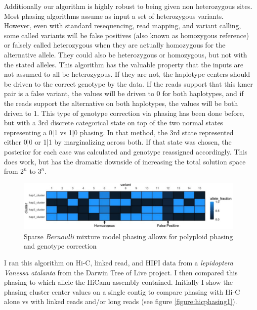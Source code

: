 \par{
Additionally our algorithm is highly robust to being given non heterozygous sites. Most phasing algorithms assume as input a set of heterozygous variants. However, even with standard resequencing, read mapping, and variant calling, some called variants will be false positives (also known as homozygous reference) or falsely called heterozygous when they are actually homozygous for the alternative allele. They could also be heterozygous or homozygous, but not with the stated alleles. This algorithm has the valuable property that the inputs are not assumed to all be heterozygous. If they are not, the haplotype centers should be driven to the correct genotype by the data. If the reads support that this kmer pair is a false variant, the values will be driven to 0 for both haplotypes, and if the reads support the alternative on both haplotypes, the values will be both driven to 1. This type of genotype correction via phasing has been done before, but with a 3rd discrete categorical state on top of the two normal states representing a 0|1 vs 1|0 phasing\cite{mypatent}. In that method, the 3rd state represented either 0|0 or 1|1 by marginalizing across both. If that state was chosen, the posterior for each case was calculated and genotype reassigned accordingly. This does work, but has the dramatic downside of increasing the total solution space from $2^n$ to $3^n$.
} 


\begin{figure}[htbp!]
\caption{Sparse \textit{Bernoulli} mixture model phasing allows for polyploid phasing and genotype correction}
\label{figure:bernoulli}
\begin{centering}
\includegraphics[width=\textwidth]{poly.png}
\end{centering}
\end{figure}


\par{
I ran this algorithm on Hi-C, linked read, and HIFI data from a \textit{lepidoptera} \textit{Vanessa atalanta} from the Darwin Tree of Live project. I then compared this phasing to which allele the HiCanu assembly 
contained. Initially I show the phasing cluster center values on a single contig to compare phasing with Hi-C alone vs with linked reads and/or long reads (see figure \ref{figure:hicphasing1}).
}

